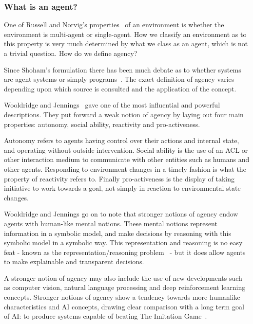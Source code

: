 \documentclass[]{final_report}
\begin{document}
\subsubsection{What is an agent?}
One of Russell and Norvig's properties~\cite{russell2016artificial} of an environment is whether the environment is multi-agent or single-agent. How we classify an environment as to this property is very much determined by what we class as an agent, which is not a trivial question. How do we define agency?\par 
Since Shoham's formulation there has been much debate as to whether systems are agent systems or simply programs~\cite{franklin1996agent}. The exact definition of agency varies depending upon which source is consulted and the application of the concept.\par 
Wooldridge and Jennings~\cite{wooldridge_jennings_1995} gave one of the most influential and powerful descriptions. They put forward a weak notion of agency by laying out four main properties: autonomy, social ability, reactivity and pro-activeness.\par 
Autonomy refers to agents having control over their actions and internal state, and operating without outside intervention. Social ability is the use of an ACL or other interaction medium to communicate with other entities such as humans and other agents. Responding to environment changes in a timely fashion is what the property of reactivity refers to. Finally pro-activeness is the display of taking initiative to work towards a goal, not simply in reaction to environmental state changes.\par 
Wooldridge and Jennings go on to note that stronger notions of agency endow agents with human-like mental notions. These mental notions represent information in a symbolic model, and make decisions by reasoning with this symbolic model in a symbolic way. This representation and reasoning is no easy feat - known as the representation/reasoning problem~\cite{wooldridge2009introduction} - but it does allow agents to make explainable and transparent decisions.\par 
A stronger notion of agency may also include the use of new developments such as computer vision, natural language processing and deep reinforcement learning concepts. Stronger notions of agency show a tendency towards more humanlike characteristics and AI concepts, drawing clear comparison with a long term goal of AI: to produce systems capable of beating The Imitation Game~\cite{machinery1950computing}.
\end{document}
